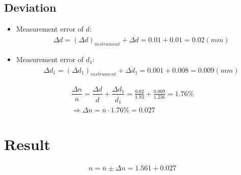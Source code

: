 \documentclass[12pt, a4paper]{article}
\newcommand{\avg}{\overline}
\newcommand{\ra}{\Rightarrow}
\newcommand{\Dt}{\Delta}
\newcommand{\hi}{\section}
\newcommand{\hii}{\subsection}
\newcommand{\relerr}[1]{\dfrac{\Dt #1}{\avg{#1}}}
\begin{document}
    \hii{Deviation}
        \begin{itemize}
            \item Measurement error of $d$: \\
                \begin{align*}
                    & \Dt d = (\Dt d)_{instrument} + \avg{\Dt d} = 0.01 + 0.01 = 0.02 (mm)
                \end{align*}
            \item Measurement error of $d_{1}$: \\
                \begin{align*}
                    & \Dt d_{1} = (\Dt d_{1})_{instrument} + \avg{\Dt d_{1}} = 0.001 + 0.008 = 0.009 (mm)
                \end{align*}
        \end{itemize}
        \begin{align*}
            \relerr{n} = \relerr{d} + \relerr{d_{1}} = \frac{0.02}{1.93} + \frac{0.009}{1.236} = 1.76 \% \\
            \ra \Dt n = \avg{n} \cdot 1.76 \% = 0.027
        \end{align*}

\hi{Result}
    \begin{tcolorbox}
        \begin{align*}
            n = \avg{n} \pm \Dt n = 1.561 + 0.027
        \end{align*}
    \end{tcolorbox}
\end{document}
